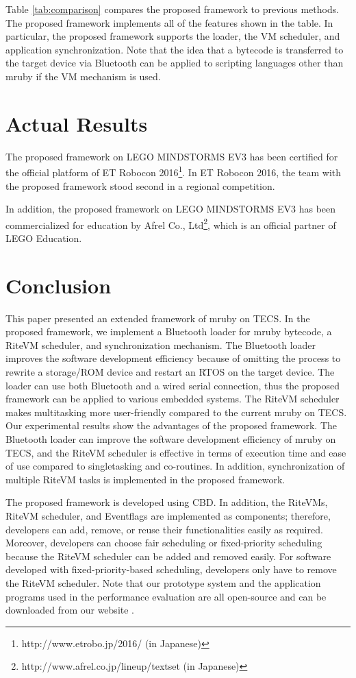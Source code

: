 \documentclass[S,R,E]{article/compsoft}
\begin{document}
{Table \ref{tab:comparison} compares the proposed framework to previous methods.
The proposed framework implements all of the features shown in the table.
In particular, the proposed framework supports the loader, the VM scheduler, and application synchronization.
Note that the idea that a bytecode is transferred to the target device via Bluetooth can be applied to scripting languages other than mruby if the VM mechanism is used.
 
\section{Actual Results}
\label{sec:Results}
The proposed framework on LEGO MINDSTORMS EV3 \cite{url:download} has been certified for the official platform of ET Robocon 2016\footnote{http://www.etrobo.jp/2016/ (in Japanese)}.
In ET Robocon 2016, the team with the proposed framework stood second in a regional competition.

In addition, the proposed framework on LEGO MINDSTORMS EV3 has been commercialized for education by Afrel Co., Ltd\footnote{http://www.afrel.co.jp/lineup/textset (in Japanese)}, which is an official partner of LEGO Education.

\section{Conclusion}
\label{sec:Conclusion}
This paper presented an extended framework of mruby on TECS.
In the proposed framework, we implement a Bluetooth loader for mruby bytecode, a RiteVM scheduler, and synchronization mechanism.
The Bluetooth loader improves the software development efficiency because of omitting the process to rewrite a storage/ROM device and restart an RTOS on the target device.
The loader can use both Bluetooth and a wired serial connection, thus the proposed framework can be applied to various embedded systems.
The RiteVM scheduler makes multitasking more user-friendly compared to the current mruby on TECS.
Our experimental results show the advantages of the proposed framework.
The Bluetooth loader can improve the software development efficiency of mruby on TECS, and the RiteVM scheduler is effective in terms of execution time and ease of use compared to singletasking and co-routines.
In addition, synchronization of multiple RiteVM tasks is implemented in the proposed framework.

The proposed framework is developed using CBD.
In addition, the RiteVMs, RiteVM scheduler, and Eventflags are implemented as components; therefore, developers can add, remove, or reuse their functionalities easily as required.
Moreover, developers can choose fair scheduling or fixed-priority scheduling because the RiteVM scheduler can be added and removed easily.
For software developed with fixed-priority-based scheduling, developers only have to remove the RiteVM scheduler.
Note that our prototype system and the application programs used in the performance evaluation are all open-source and can be downloaded from our website \cite{url:download}.

}
\end{document}
